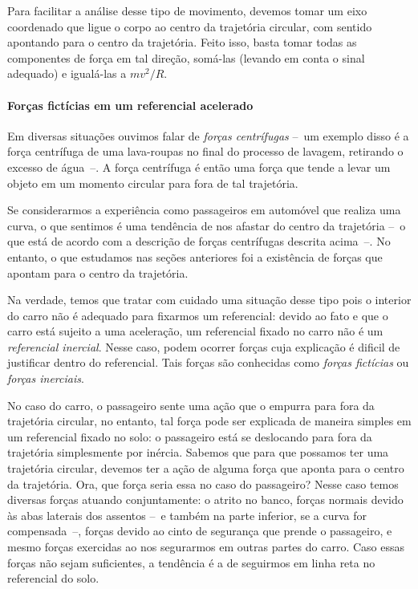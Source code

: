Para facilitar a análise desse tipo de movimento, devemos tomar um eixo coordenado que ligue o corpo ao centro da trajetória circular, com sentido apontando para o centro da trajetória. Feito isso, basta tomar todas as componentes de força em tal direção, somá-las (levando em conta o sinal adequado) e igualá-las a $m v^2/R$.

\paragraph{Forças fictícias em um referencial acelerado}

Em diversas situações ouvimos falar de \emph{forças centrífugas} --~um exemplo disso é a força centrífuga de uma lava-roupas no final do processo de lavagem, retirando o excesso de água~--. A força centrífuga é então uma força que tende a levar um objeto em um momento circular para fora de tal trajetória.

Se considerarmos a experiência como passageiros em automóvel que realiza uma curva, o que sentimos é uma tendência de nos afastar do centro da trajetória --~o que está de acordo com a descrição de forças centrífugas descrita acima~--. No entanto, o que estudamos nas seções anteriores foi a existência de forças que apontam para o centro da trajetória.

Na verdade, temos que tratar com cuidado uma situação desse tipo pois o interior do carro não é adequado para fixarmos um referencial: devido ao fato e que o carro está sujeito a uma aceleração, um referencial fixado no carro não é um \emph{referencial inercial}. Nesse caso, podem ocorrer forças cuja explicação é dificil de justificar dentro do referencial. Tais forças são conhecidas como \emph{forças fictícias} ou \emph{forças inerciais}.

No caso do carro, o passageiro sente uma ação que o empurra para fora da trajetória circular, no entanto, tal força pode ser explicada de maneira simples em um referencial fixado no solo: o passageiro está se deslocando para fora da trajetória simplesmente por inércia. Sabemos que para que possamos ter uma trajetória circular, devemos ter a ação de alguma força que aponta para o centro da trajetória. Ora, que força seria essa no caso do passageiro? Nesse caso temos diversas forças atuando conjuntamente: o atrito no banco, forças normais devido às abas laterais dos assentos --~e também na parte inferior, se a curva for compensada~--, forças devido ao cinto de segurança que prende o passageiro, e mesmo forças exercidas ao nos segurarmos em outras partes do carro. Caso essas forças não sejam suficientes, a tendência é a de seguirmos em linha reta no referencial do solo.

